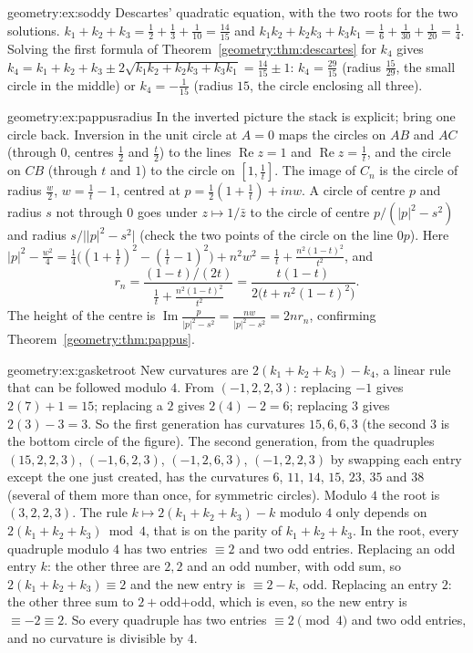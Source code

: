 \begin{solution}{geometry:ex:soddy}
\idea Descartes' quadratic equation, with the two roots for the two solutions.
\writeup $k_1+k_2+k_3=\frac12+\frac13+\frac1{10}=\frac{14}{15}$ and $k_1k_2+k_2k_3+k_3k_1=\frac16+\frac1{30}+\frac1{20}=\frac14$. Solving the first formula of
Theorem~\ref{geometry:thm:descartes} for $k_4$ gives $k_4=k_1+k_2+k_3\pm2\sqrt{k_1k_2+k_2k_3+k_3k_1}=\frac{14}{15}\pm1$: $k_4=\frac{29}{15}$ (radius
$\frac{15}{29}$, the small circle in the middle) or $k_4=-\frac1{15}$ (radius $15$, the circle enclosing all three).
\end{solution}

\begin{solution}{geometry:ex:pappusradius}
\idea In the inverted picture the stack is explicit; bring one circle back.
\writeup Inversion in the unit circle at $A=0$ maps the circles on $AB$ and $AC$ (through $0$, centres $\frac12$ and $\frac t2$) to the lines
$\operatorname{Re}z=1$ and $\operatorname{Re}z=\frac1t$, and the circle on $CB$ (through $t$ and $1$) to the circle on $[1,\frac1t]$. The image of $C_n$ is the
circle of radius $\frac w2$, $w=\frac1t-1$, centred at $p=\frac12(1+\frac1t)+inw$. A circle of centre $p$ and radius $s$ not through $0$ goes under
$z\mapsto1/\bar z$ to the circle of centre $p/(|p|^2-s^2)$ and radius $s/\bigl||p|^2-s^2\bigr|$ (check the two points of the circle on the line $0p$).
Here $|p|^2-\frac{w^2}4=\frac14\bigl((1+\frac1t)^2-(\frac1t-1)^2\bigr)+n^2w^2=\frac1t+\frac{n^2(1-t)^2}{t^2}$, and
\[
r_n=\frac{(1-t)/(2t)}{\frac1t+\frac{n^2(1-t)^2}{t^2}}=\frac{t(1-t)}{2\bigl(t+n^2(1-t)^2\bigr)} .
\]
The height of the centre is $\operatorname{Im}\frac p{|p|^2-s^2}=\frac{nw}{|p|^2-s^2}=2nr_n$, confirming Theorem~\ref{geometry:thm:pappus}.
\end{solution}

\begin{solution}{geometry:ex:gasketroot}
\idea New curvatures are $2(k_1+k_2+k_3)-k_4$, a linear rule that can be followed modulo $4$.
\writeup From $(-1,2,2,3)$: replacing $-1$ gives $2(7)+1=15$; replacing a $2$ gives $2(4)-2=6$; replacing $3$ gives $2(3)-3=3$. So the first
generation has curvatures $15,6,6,3$ (the second $3$ is the bottom circle of the figure). The second generation, from the quadruples
$(15,2,2,3)$, $(-1,6,2,3)$, $(-1,2,6,3)$, $(-1,2,2,3)$ by swapping each entry except the one just created, has the
curvatures $6$, $11$, $14$, $15$, $23$, $35$ and $38$ (several of them more than once, for symmetric circles). Modulo $4$ the root is $(3,2,2,3)$. The
rule $k\mapsto2(k_1+k_2+k_3)-k$ modulo $4$ only depends on $2(k_1+k_2+k_3)\bmod4$, that is on the parity of $k_1+k_2+k_3$. In the root, every
quadruple modulo $4$ has two entries $\equiv2$ and two odd entries. Replacing an odd entry $k$: the other three are $2,2$ and an odd number, with odd
sum, so $2(k_1+k_2+k_3)\equiv2$ and the new entry is $\equiv2-k$, odd. Replacing an entry $2$: the other three sum to $2+$odd$+$odd, which is
even, so the new entry is $\equiv-2\equiv2$. So every
quadruple has two entries $\equiv2\pmod 4$ and two odd entries, and no curvature is divisible by $4$.
\end{solution}

